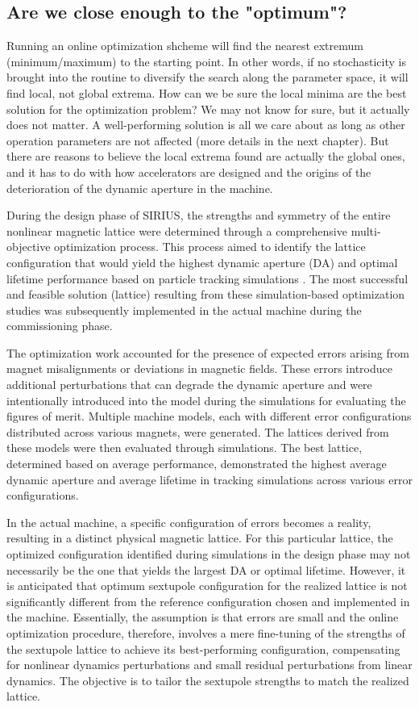 \subsection{Are we close enough to the "optimum"?}
Running an online optimization shcheme will find the nearest extremum (minimum/maximum) to the starting point. In other words, if no stochasticity is brought into the routine to diversify the search along the parameter space, it will find local, not global extrema. How can we be sure the local minima are the best solution for the optimization problem? We may not know for sure, but it actually does not matter. A well-performing solution is all we care about as long as other operation parameters are not affected (more details in the next chapter). But there are reasons to believe the local extrema found are actually the global ones, and it has to do with how accelerators are designed and the origins of the deterioration of the dynamic aperture in the machine.

During the design phase of SIRIUS, the strengths and symmetry of the entire nonlinear magnetic lattice were determined through a comprehensive multi-objective optimization process. This process aimed to identify the lattice configuration that would yield the highest dynamic aperture (DA) and optimal lifetime performance based on particle tracking simulations \cite{de_sa_optimization_2016}. The most successful and feasible solution (lattice) resulting from these simulation-based optimization studies was subsequently implemented in the actual machine during the commissioning phase.

The optimization work accounted for the presence of expected errors arising from magnet misalignments or deviations in magnetic fields. These errors introduce additional perturbations that can degrade the dynamic aperture and were intentionally introduced into the model during the simulations for evaluating the figures of merit. Multiple machine models, each with different error configurations distributed across various magnets, were generated. The lattices derived from these models were then evaluated through simulations. The best lattice, determined based on average performance, demonstrated the highest average dynamic aperture and average lifetime in tracking simulations across various error configurations.

In the actual machine, a specific configuration of errors becomes a reality, resulting in a distinct physical magnetic lattice. For this particular lattice, the optimized configuration identified during simulations in the design phase may not necessarily be the one that yields the largest DA or optimal lifetime. However, it is anticipated that optimum sextupole configuration for the realized lattice is not significantly different from the reference configuration chosen and implemented in the machine. Essentially, the assumption is that errors are small and the online optimization procedure, therefore, involves a mere fine-tuning of the strengths of the sextupole lattice to achieve its best-performing configuration, compensating for nonlinear dynamics perturbations and small residual perturbations from linear dynamics. The objective is to tailor the sextupole strengths to match the realized lattice.

